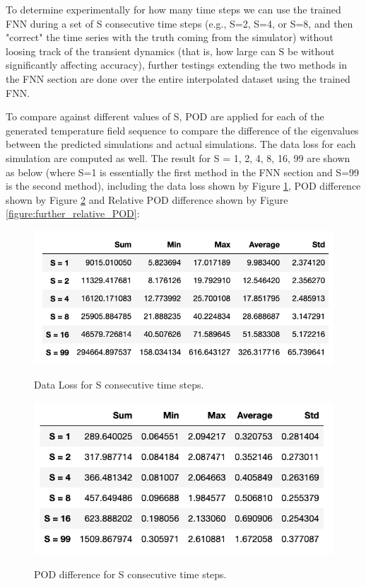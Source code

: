 To determine experimentally for how many time steps we can use the trained FNN during a set of S consecutive time steps (e.g., S=2, S=4, or S=8, and then "correct" the time series with the truth coming from the simulator) without loosing track of the transient dynamics (that is, how large can S be without significantly affecting accuracy), further testings extending the two methods in the FNN section are done over the entire interpolated dataset using the trained FNN.

To compare against different values of S, POD are applied for each of the generated temperature field sequence to compare the difference of the eigenvalues between the predicted simulations and actual simulations. The data loss for each simulation are computed as well. The result for S = 1, 2, 4, 8, 16, 99 are shown as below (where S=1 is essentially the first method in the FNN section and S=99 is the second method), including the data loss shown by Figure \ref{figure:further_loss}, POD difference shown by Figure \ref{figure:further_POD} and Relative POD difference shown by Figure \ref{figure:further_relative_POD}:

\begin{figure}[H]
    \caption{Data Loss for S consecutive time steps.}
    \includegraphics[scale=0.7]{figures/mantle_convection_images/further_testings/Data_Loss_table.png}
    \label{figure:further_loss}
\end{figure}

\begin{figure}[H]
    \caption{POD difference for S consecutive time steps.}
    \includegraphics[scale=0.7]{figures/mantle_convection_images/further_testings/POD_table.png}
    \label{figure:further_POD}
\end{figure}


